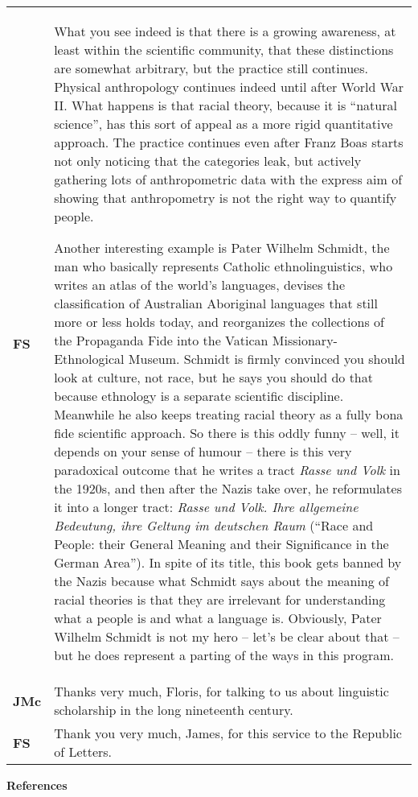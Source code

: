 \documentclass[12pt]{article}
\newenvironment{styleStandard}{\setlength\leftskip{0cm}\setlength\rightskip{0cm plus 1fil}\setlength\parindent{0cm}\setlength\parfillskip{0pt plus 1fil}\setlength\parskip{0in plus 1pt}\writerlistparindent\writerlistleftskip\leavevmode\normalfont\normalsize\writerlistlabel\ignorespaces}{\unskip\vspace{0in plus 1pt}\par}
\newcommand\writerlistleftskip{}
\newcommand\writerlistparindent{}
\newcommand\writerlistlabel{}
\begin{document}
\begin{flushleft}
\begin{supertabular}{m{0.24415985in}m{5.89766in}}
\textbf{FS}\newline
 &
What you see indeed is that there is a growing awareness, at least within the scientific community, that these distinctions are somewhat arbitrary, but the practice still continues. Physical anthropology continues indeed until after World War II. What happens is that racial theory, because it is “natural science”, has this sort of appeal as a more rigid quantitative approach. The practice continues even after Franz Boas starts not only noticing that the categories leak, but actively gathering lots of anthropometric data with the express aim of showing that anthropometry is not the right way to quantify people. 

Another interesting example is Pater Wilhelm Schmidt, the man who basically represents Catholic ethnolinguistics, who writes an atlas of the world’s languages, devises the classification of Australian Aboriginal languages that still more or less holds today, and reorganizes the collections of the Propaganda Fide into the Vatican Missionary-Ethnological Museum. Schmidt is firmly convinced you should look at culture, not race, but he says you should do that because ethnology is a separate scientific discipline. Meanwhile he also keeps treating racial theory as a fully bona fide scientific approach. So there is this oddly funny – well, it depends on your sense of humour – there is this very paradoxical outcome that he writes a tract \textit{Rasse und Volk} in the 1920s, and then after the Nazis take over, he reformulates it into a longer tract: \textit{Rasse und Volk. Ihre allgemeine Bedeutung, ihre Geltung im deutschen Raum} (“Race and People: their General Meaning and their Significance in the German Area”). In spite of its title, this book gets banned by the Nazis because what Schmidt says about the meaning of racial theories is that they are irrelevant for understanding what a people is and what a language is. Obviously, Pater Wilhelm Schmidt is not my hero – let’s be clear about that – but he does represent a parting of the ways in this program.\\
\textbf{JMc}\newline
 &
Thanks very much, Floris, for talking to us about linguistic scholarship in the long nineteenth century.\\
\textbf{FS}\newline
 &
Thank you very much, James, for this service to the Republic of Letters.\\
\end{supertabular}
\end{flushleft}
\begin{styleStandard}
\textbf{References}
\end{styleStandard}
\end{document}
